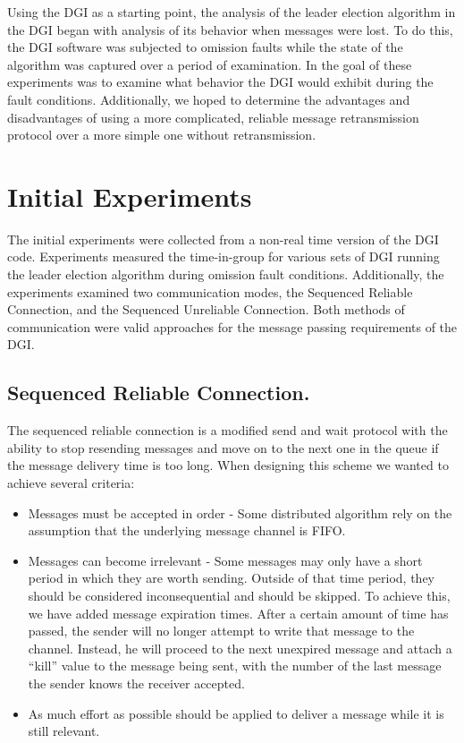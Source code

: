 Using the DGI as a starting point, the analysis of the leader election algorithm in the DGI began with analysis of its behavior when messages were lost.
To do this, the DGI software was subjected to omission faults while the state of the algorithm was captured over a period of examination.
In the goal of these experiments was to examine what behavior the DGI would exhibit during the fault conditions.
Additionally, we hoped to determine the advantages and disadvantages of using a more complicated, reliable message retransmission protocol over a more simple one without retransmission.

\section{Initial Experiments}

The initial experiments were collected from a non-real time version of the DGI code.
Experiments measured the time-in-group for various sets of DGI running the leader election algorithm during omission fault conditions.
Additionally, the experiments examined two communication modes, the Sequenced Reliable Connection, and the Sequenced Unreliable Connection.
Both methods of communication were valid approaches for the message passing requirements of the DGI.

\subsection{Sequenced Reliable Connection.}

The sequenced reliable connection is a modified send and wait protocol with the ability to stop resending messages and move on to the next one in the queue if the message delivery time is too long. When designing this scheme we wanted to achieve several criteria:

\begin{itemize}
\item Messages must be accepted in order - Some distributed algorithm rely on the assumption that the underlying message channel is FIFO.
\item Messages can become irrelevant - Some messages may only have a short period in which they are worth sending. Outside of that time period, they should be considered inconsequential and should be skipped. To achieve this, we have added message expiration times. After a certain amount of time has passed, the sender will no longer attempt to write that message to the channel. Instead, he will proceed to the next unexpired message and attach a ``kill'' value to the message being sent, with the number of the last message the sender knows the receiver accepted.
\item As much effort as possible should be applied to deliver a message while it is still relevant.
\end{itemize}


